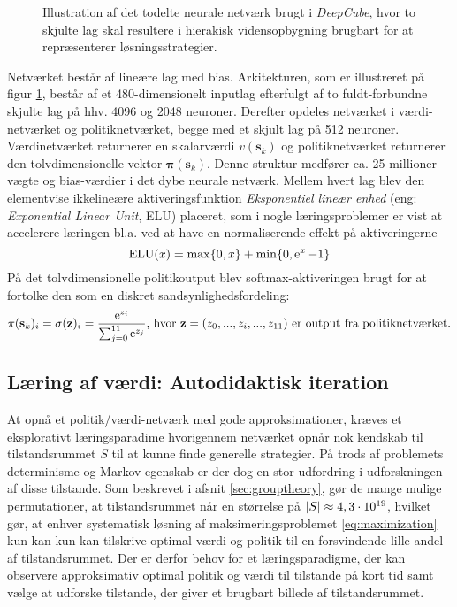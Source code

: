 \documentclass[../main.tex]{subfiles}
\begin{document}
\begin{figure}[H]
	\centering

\caption{Illustration af det todelte neurale netværk brugt i \textit{DeepCube}, hvor to skjulte lag skal resultere i hierakisk vidensopbygning brugbart for at repræsenterer løsningsstrategier.}
\label{fig:DNN}
\end{figure}
\noindent Netværket består af lineære lag med bias.  Arkitekturen, som er illustreret på figur \ref{fig:DNN}, består af et 480-dimensionelt inputlag efterfulgt af to fuldt-forbundne skjulte lag på hhv. 4096 og 2048 neuroner. Derefter opdeles netværket i værdi-netværket og politiknetværket, begge med et skjult lag på 512 neuroner. Værdinetværket returnerer en skalarværdi \(v(\mathbf s_k)\) og politiknetværket returnerer den tolvdimensionelle vektor \(\bm \pi (\mathbf s_k)\). Denne struktur medfører ca. 25 millioner vægte og bias-værdier i det dybe neurale netværk. Mellem hvert lag blev den elementvise ikkelineære aktiveringsfunktion \textit{Eksponentiel lineær enhed} (eng: \textit{Exponential Linear Unit}, ELU) placeret, som i nogle læringsproblemer er vist at accelerere læringen bl.a. ved at have en normaliserende effekt på aktiveringerne \cite{ELU} 
\[
\operatorname{ELU}(x) = \operatorname*{max}\{0, x\} + \operatorname{min}\{0, \operatorname{e}^{x} -1\}
\]
På det tolvdimensionelle politikoutput blev softmax-aktiveringen brugt for at fortolke den som en diskret sandsynlighedsfordeling:
\[
\pi(\mathbf s_k)_i = \sigma(\mathbf z)_i = \frac{\operatorname{e}^{z_i}}{\sum_{j=0}^{11} \operatorname{e}^{z_j}} \text{, hvor \(\mathbf z=(z_0, ..., z_i, ..., z_{11})\) er output fra politiknetværket.}
\]
\subsection*{Læring af værdi: Autodidaktisk iteration}
At opnå et politik/værdi-netværk med gode approksimationer, kræves et eksplorativt læringsparadime hvorigennem netværket opnår nok kendskab til tilstandsrummet \(S\) til at kunne finde generelle strategier. 
På trods af problemets determinisme og Markov-egenskab er der dog en stor udfordring i udforskningen af disse tilstande.
Som beskrevet i afsnit \ref{sec:grouptheory}, gør de mange mulige permutationer, at tilstandsrummet når en størrelse på \(|S|\approx 4,3\cdot10^{19}\), hvilket gør, at enhver systematisk løsning af maksimeringsproblemet \ref{eq:maximization} kun kan kun kan tilskrive optimal værdi og politik til en forsvindende lille andel af tilstandsrummet.
Der er derfor behov for et læringsparadigme, der kan observere approksimativ optimal politik og værdi til tilstande på kort tid samt vælge at udforske tilstande, der giver et brugbart billede af tilstandsrummet.
\end{document}

